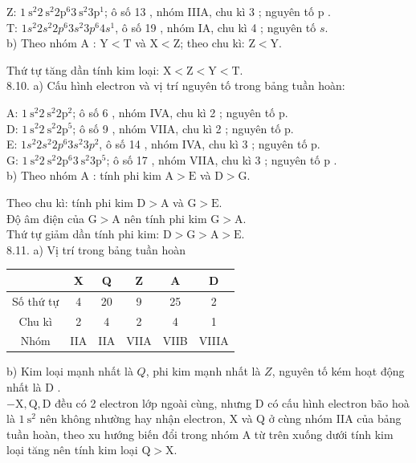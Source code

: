 \documentclass[10pt]{article}
\begin{document}
Z: $1 \mathrm{~s}^{2} 2 \mathrm{~s}^{2} 2 \mathrm{p}^{6} 3 \mathrm{~s}^{2} 3 \mathrm{p}^{1}$; ô số 13 , nhóm IIIA, chu kì 3 ; nguyên tố p .\\
T: $1 s^{2} 2 s^{2} 2 p^{6} 3 s^{2} 3 p^{6} 4 s^{1}$, ô số 19 , nhóm IA, chu kì 4 ; nguyên tố $s$.\\
b) Theo nhóm A : $\mathrm{Y}<\mathrm{T}$ và $\mathrm{X}<\mathrm{Z}$; theo chu kì: $\mathrm{Z}<\mathrm{Y}$.

Thứ tự tăng dần tính kim loại: $\mathrm{X}<\mathrm{Z}<\mathrm{Y}<\mathrm{T}$.\\
8.10. a) Cấu hình electron và vị trí nguyên tố trong bảng tuần hoàn:

A: $1 \mathrm{~s}^{2} 2 \mathrm{~s}^{2} 2 \mathrm{p}^{2}$; ô số 6 , nhóm IVA, chu kì 2 ; nguyên tố p.\\
D: $1 \mathrm{~s}^{2} 2 \mathrm{~s}^{2} 2 \mathrm{p}^{5}$; ô số 9 , nhóm VIIA, chu kì 2 ; nguyên tố p.\\
E: $1 s^{2} 2 s^{2} 2 p^{6} 3 s^{2} 3 p^{2}$, ô số 14 , nhóm IVA, chu kì 3 ; nguyên tố p.\\
G: $1 \mathrm{~s}^{2} 2 \mathrm{~s}^{2} 2 \mathrm{p}^{6} 3 \mathrm{~s}^{2} 3 \mathrm{p}^{5}$; ô số 17 , nhóm VIIA, chu kì 3 ; nguyên tố p .\\
b) Theo nhóm A : tính phi kim $\mathrm{A}>\mathrm{E}$ và $\mathrm{D}>\mathrm{G}$.

Theo chu kì: tính phi kim $\mathrm{D}>\mathrm{A}$ và $\mathrm{G}>\mathrm{E}$.\\
Độ âm điện của $\mathrm{G}>\mathrm{A}$ nên tính phi kim $\mathrm{G}>\mathrm{A}$.\\
Thứ tự giảm dần tính phi kim: $\mathrm{D}>\mathrm{G}>\mathrm{A}>\mathrm{E}$.\\
8.11. a) Vị trí trong bảng tuần hoàn

\begin{center}
\begin{tabular}{|c|c|c|c|c|c|}
\hline
 & X & Q & Z & A & D \\
\hline
Số thứ tự & 4 & 20 & 9 & 25 & 2 \\
\hline
Chu kì & 2 & 4 & 2 & 4 & 1 \\
\hline
Nhóm & IIA & IIA & VIIA & VIIB & VIIIA \\
\hline
\end{tabular}
\end{center}

b) Kim loại mạnh nhất là $Q$, phi kim mạnh nhất là $Z$, nguyên tố kém hoạt động nhất là D .\\
$-\mathrm{X}, \mathrm{Q}, \mathrm{D}$ đều có 2 electron lớp ngoài cùng, nhưng D có cấu hình electron bão hoà là $1 \mathrm{~s}^{2}$ nên không nhường hay nhận electron, X và Q ở cùng nhóm IIA của bảng tuần hoàn, theo xu hướng biến đổi trong nhóm A từ trên xuống dưới tính kim loại tăng nên tính kim loại $\mathrm{Q}>\mathrm{X}$.
\end{document}
